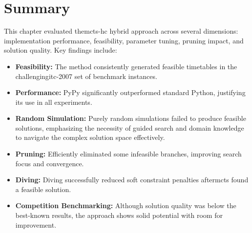 \section{Summary}

This chapter evaluated the\ac{mcts}-\ac{hc} hybrid approach across several dimensions: implementation performance, feasibility, parameter tuning, pruning impact, and solution quality. Key findings include:

\begin{itemize}
\item \textbf{Feasibility:} The method consistently generated feasible timetables in the challenging\ac{itc-2007} set of benchmark instances.

\item \textbf{Performance:} PyPy significantly outperformed standard Python, justifying its use in all experiments.

\item \textbf{Random Simulation:} Purely random simulations failed to produce feasible solutions, emphasizing the necessity of guided search and domain knowledge to navigate the complex solution space effectively.

\item \textbf{Pruning:} Efficiently eliminated some infeasible branches, improving search focus and convergence.

\item \textbf{Diving:} Diving successfully reduced soft constraint penalties after\ac{mcts} found a feasible solution.

\item \textbf{Competition Benchmarking:} Although solution quality was below the best-known results, the approach shows solid potential with room for improvement.
\end{itemize}